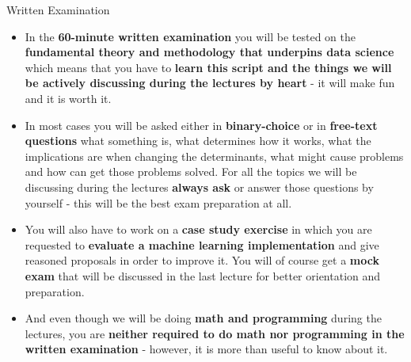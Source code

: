 \documentclass[main.tex]{subfiles}
\begin{document}
    \begin{frame}{Written Examination}
        \begin{itemize}
            \item In the \textbf{60-minute written examination} you will be tested on the \textbf{fundamental theory and methodology that underpins data science} which means that you have to \textbf{learn this script and the things we will be actively discussing during the lectures by heart} - it will make fun and it is worth it.
            \item In most cases you will be asked either in \textbf{binary-choice} or in \textbf{free-text questions} what something is, what determines how it works, what the implications are when changing the determinants, what might cause problems and how can get those problems solved. For all the topics we will be discussing during the lectures \textbf{always ask} or answer those questions by yourself - this will be the best exam preparation at all.
            \item You will also have to work on a \textbf{case study exercise} in which you are requested to \textbf{evaluate a machine learning implementation} and give reasoned proposals in order to improve it. You will of course get a \textbf{mock exam} that will be discussed in the last lecture for better orientation and preparation.
            \item And even though we will be doing \textbf{math and programming} during the lectures, you are \textbf{neither required to do math nor programming in the written examination} - however, it is more than useful to know about it.
        \end{itemize}
    \end{frame}
\end{document}
